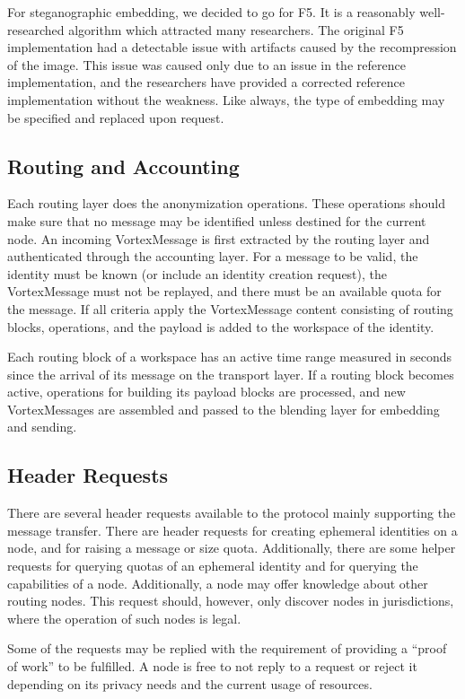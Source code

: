 \documentclass[10pt,journal,compsoc]{IEEEtran}
\begin{document}
For steganographic embedding, we decided to go for F5\cite{f5}. It is a reasonably well-researched algorithm which attracted many researchers. The original F5 implementation had a detectable issue with artifacts\cite{F5broken} caused by the recompression of the image. This issue was caused only due to an issue in the reference implementation, and the researchers have provided a corrected reference implementation without the weakness. Like always, the type of embedding may be specified and replaced upon request. 

\subsection{Routing and Accounting\label{sec:routingAndAccounting}}
Each routing layer does the anonymization operations. These operations should make sure that no message may be identified unless destined for the current node. An incoming  VortexMessage is first extracted by the routing layer and authenticated through the accounting layer. For a message to be valid, the identity must be known (or include an identity creation request), the VortexMessage must not be replayed, and there must be an available quota for the message. If all criteria apply the VortexMessage content consisting of routing blocks, operations, and the payload is added to the workspace of the identity.

Each routing block of a workspace has an active time range measured in seconds since the arrival of its message on the transport layer. If a routing block becomes active, operations for building its payload blocks are processed, and new VortexMessages are assembled and passed to the blending layer for embedding and sending.

\subsection{Header Requests}
There are several header requests available to the protocol mainly supporting the message transfer. There are header requests for creating ephemeral identities on a node, and for raising a message or size quota. Additionally, there are some helper requests for querying quotas of an ephemeral identity and for querying the capabilities of a node. Additionally, a node may offer knowledge about other routing nodes. This request should, however, only discover nodes in jurisdictions, where the operation of such nodes is legal.

Some of the requests may be replied with the requirement of providing a ``proof of work'' to be fulfilled. A node is free to not reply to a request or reject it depending on its privacy needs and the current usage of resources.
\end{document}
